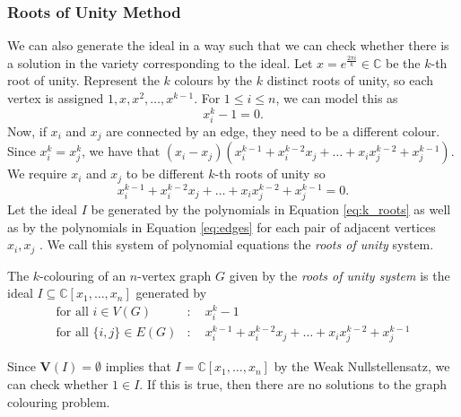 \documentclass[../main.tex]{subfiles}
\begin{document}
    \subsubsection{Roots of Unity Method} \label{subsec:roi}
    
    We can also generate the ideal in a way such that we can check whether there is a solution in the variety corresponding to the ideal. Let $x=e^{\frac{2\pi i}{k}}\in \mathbb{C}$ be the $k$-th root of unity. Represent the $k$ colours by the $k$ distinct roots of unity, so each vertex is assigned $1, x, x^2,\dots,x^{k-1}$. For $1\leq i\leq n$, we can model this as
    \begin{equation} \label{eq:k_roots}
        x_i^k-1=0.
    \end{equation}
    Now, if $x_i$ and $x_j$ are connected by an edge, they need to be a different colour. Since $x_i^k = x_j^k$, we have that $(x_i-x_j)(x_i^{k-1} + x_i^{k-2}x_j+\dots+x_ix_j^{k-2}+x_j^{k-1})$. We require $x_i$ and $x_j$ to be different $k$-th roots of unity so 
    \begin{equation} \label{eq:edges}
        x_i^{k-1} + x_i^{k-2}x_j+\dots+x_ix_j^{k-2}+x_j^{k-1}=0.
    \end{equation}
    Let the ideal $I$ be generated by the polynomials in Equation \ref{eq:k_roots} as well as by the polynomials in Equation \ref{eq:edges} for each pair of adjacent vertices $x_i, x_j$ . We call this system of polynomial equations the \emph{roots of unity} system.
    \begin{definition}
        The $k$-colouring of an $n$-vertex graph $G$ given by the \emph{roots of unity system} is the ideal $I\subseteq \mathbb{C}[x_1,\dots,x_n]$ generated by 
        \begin{align*}
            \text{for all $i\in V(G)$}&: \quad x_i^k-1 \\
            \text{for all $\{i,j\}\in E(G)$}&: \quad x_i^{k-1} + x_i^{k-2}x_j+\dots+x_ix_j^{k-2}+x_j^{k-1}
        \end{align*}
    \end{definition}

    Since $\mathbf{V}(I) = \emptyset$ implies that $I=\mathbb{C}[x_1,\dots,x_n]$ by the Weak Nullstellensatz, we can check whether $1\in I$. If this is true, then there are no solutions to the graph colouring problem. 
\end{document}

